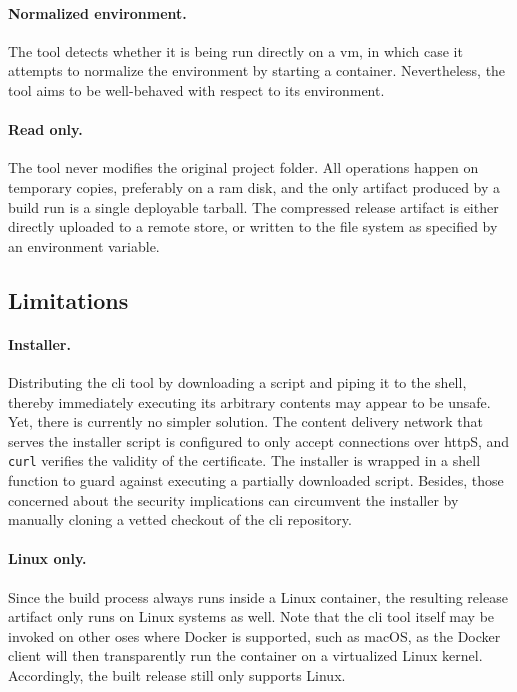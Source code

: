 \paragraph{Normalized environment.} The tool detects whether it is being run directly on a \acrshort{vm}, in which case it attempts to normalize the environment by starting a container. Nevertheless, the tool aims to be well-behaved with respect to its environment.

\paragraph{Read only.} The tool never modifies the original project folder. All operations happen on temporary copies, preferably on a \acrshort{ram} disk, and the only artifact produced by a build run is a single deployable tarball. The compressed release artifact is either directly uploaded to a remote store, or written to the file system as specified by an environment variable.

\cleardoublepage
\subsection{Limitations}

\paragraph{Installer.}\label{sec:curlpipesh} Distributing the \acrshort{cli} tool by downloading a script and piping it to the shell, thereby immediately executing its arbitrary contents may appear to be unsafe. Yet, there is currently no simpler solution. The content delivery network that serves the installer script is configured to only accept connections over \acrshort{http}S, and \lstinline|curl| verifies the validity of the certificate. The installer is wrapped in a shell function to guard against executing a partially downloaded script. Besides, those concerned about the security implications can circumvent the installer by manually cloning a vetted checkout of the \acrshort{cli} repository.

\paragraph{Linux only.} Since the build process always runs inside a Linux container, the resulting release artifact only runs on Linux systems as well. Note that the \acrshort{cli} tool itself may be invoked on other \acrshort{os}es where Docker is supported, such as macOS, as the Docker client will then transparently run the container on a virtualized Linux kernel.\cite{docker:docs} Accordingly, the built release still only supports Linux.

